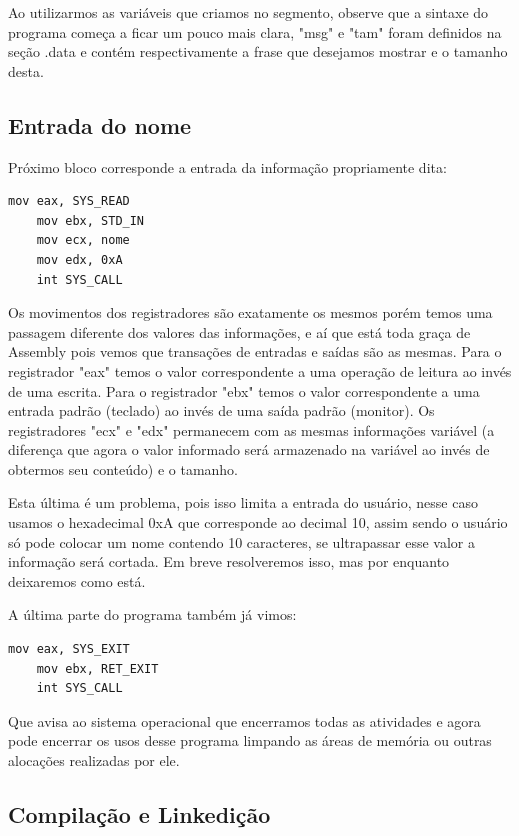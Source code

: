 Ao utilizarmos as variáveis que criamos no segmento, observe que a sintaxe do programa começa a ficar um pouco mais clara, "msg" e "tam" foram definidos na seção .data e contém respectivamente a frase que desejamos mostrar e o tamanho desta.

\subsection{Entrada do nome}

Próximo bloco corresponde a entrada da informação propriamente dita:
\begin{lstlisting}[]
	mov eax, SYS_READ
	mov ebx, STD_IN
	mov ecx, nome
	mov edx, 0xA
	int SYS_CALL
\end{lstlisting}

Os movimentos dos registradores são exatamente os mesmos porém temos uma passagem diferente dos valores das informações, e aí que está toda graça de Assembly pois vemos que transações de entradas e saídas são as mesmas. Para o registrador "eax" temos o valor correspondente a uma operação de leitura ao invés de uma escrita. Para o registrador "ebx" temos o valor correspondente a uma entrada padrão (teclado) ao invés de uma saída padrão (monitor). Os registradores "ecx" e "edx" permanecem com as mesmas informações variável (a diferença que agora o valor informado será armazenado na variável ao invés de obtermos seu conteúdo) e o tamanho.

Esta última é um problema, pois isso limita a entrada do usuário, nesse caso usamos o hexadecimal 0xA que corresponde ao decimal 10, assim sendo o usuário só pode colocar um nome contendo 10 caracteres, se ultrapassar esse valor a informação será cortada. Em breve resolveremos isso, mas por enquanto deixaremos como está.

A última parte do programa também já vimos:
\begin{lstlisting}[]
	mov eax, SYS_EXIT
	mov ebx, RET_EXIT
	int SYS_CALL
\end{lstlisting}

Que avisa ao sistema operacional que encerramos todas as atividades e agora pode encerrar os usos desse programa limpando as áreas de memória ou outras alocações realizadas por ele.

\subsection{Compilação e Linkedição}

